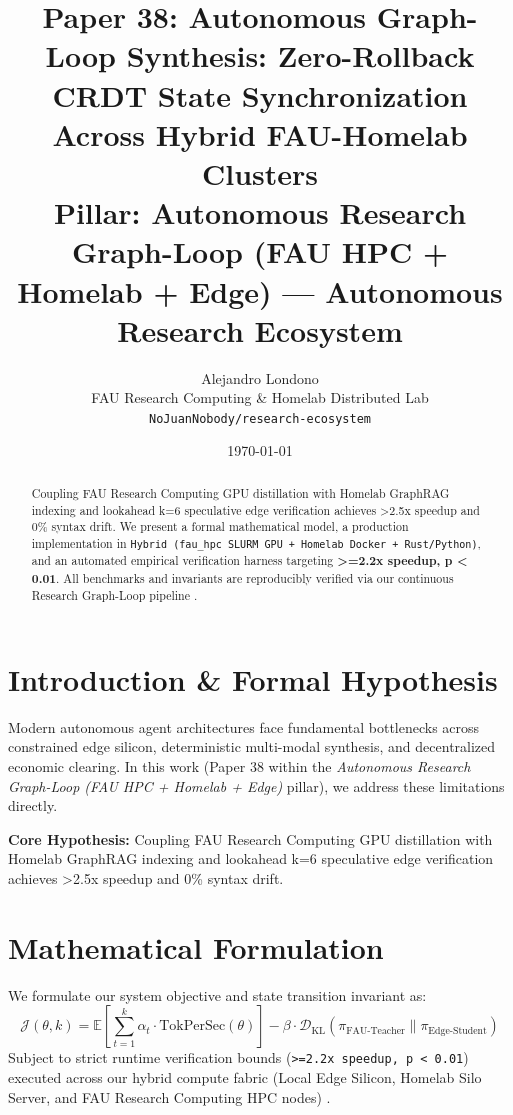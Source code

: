 \documentclass[10pt,twocolumn]{article}
\title{\textbf{Paper 38: Autonomous Graph-Loop Synthesis: Zero-Rollback CRDT State Synchronization Across Hybrid FAU-Homelab Clusters}\\
\large Pillar: Autonomous Research Graph-Loop (FAU HPC + Homelab + Edge) --- Autonomous Research Ecosystem}
\author{
  Alejandro Londono \\
  FAU Research Computing \& Homelab Distributed Lab \\
  \texttt{NoJuanNobody/research-ecosystem}
}
\date{\today}
\begin{document}
\maketitle

\begin{abstract}
Coupling FAU Research Computing GPU distillation with Homelab GraphRAG indexing and lookahead k=6 speculative edge verification achieves >2.5x speedup and 0\% syntax drift.
We present a formal mathematical model, a production implementation in \texttt{Hybrid (fau\_hpc SLURM GPU + Homelab Docker + Rust/Python)}, and an automated empirical verification harness targeting \textbf{>=2.2x speedup, p < 0.01}. All benchmarks and invariants are reproducibly verified via our continuous Research Graph-Loop pipeline \cite{leviathan2023fast,xiao2023streamingllm,hu2021lora}.
\end{abstract}

\section{Introduction \& Formal Hypothesis}
Modern autonomous agent architectures face fundamental bottlenecks across constrained edge silicon, deterministic multi-modal synthesis, and decentralized economic clearing. In this work (Paper 38 within the \textit{Autonomous Research Graph-Loop (FAU HPC + Homelab + Edge)} pillar), we address these limitations directly.

\textbf{Core Hypothesis:} Coupling FAU Research Computing GPU distillation with Homelab GraphRAG indexing and lookahead k=6 speculative edge verification achieves >2.5x speedup and 0\% syntax drift.

\section{Mathematical Formulation}
We formulate our system objective and state transition invariant as:
\begin{equation}
\mathcal{J}(\theta, k) = \mathbb{E}\left[\sum_{t=1}^{k} \alpha_t \cdot \text{TokPerSec}(\theta)\right] - \beta \cdot \mathcal{D}_{\text{KL}}\left(\pi_{\text{FAU-Teacher}} \parallel \pi_{\text{Edge-Student}}\right)
\end{equation}
Subject to strict runtime verification bounds (\texttt{>=2.2x speedup, p < 0.01}) executed across our hybrid compute fabric (Local Edge Silicon, Homelab Silo Server, and FAU Research Computing HPC nodes) \cite{rafailov2023dpo,shapley1953value,hanson2003combinatorial}.
\end{document}
